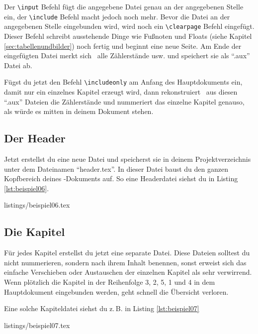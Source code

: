 Der \texttt{\textbackslash input} Befehl fügt die angegebene Datei genau an der angegebenen Stelle ein, der \texttt{\textbackslash include} Befehl macht jedoch noch mehr. Bevor die Datei an der angegebenen Stelle eingebunden wird, wird noch ein \texttt{\textbackslash clearpage} Befehl eingefügt. Dieser Befehl schreibt ausstehende Dinge wie Fußnoten und Floats (siehe Kapitel \ref{sec:tabellenundbilder}) noch fertig und beginnt eine neue Seite. Am Ende der eingefügten Datei merkt sich \DMLLaTeX \ alle Zählerstände usw. und speichert sie als \enquote{.aux} Datei ab.

Fügst du jetzt den Befehl \texttt{\textbackslash includeonly} am Anfang des Hauptdokuments ein, damit nur ein einzelnes Kapitel erzeugt wird, dann rekonstruiert \DMLLaTeX \ aus diesen \enquote{.aux} Dateien die Zählerstände und nummeriert das einzelne Kapitel genauso, als würde es mitten in deinem Dokument stehen.

\subsection{Der Header}

Jetzt erstellst du eine neue Datei und speicherst sie in deinem Projektverzeichnis unter dem Dateinamen \enquote{header.tex}. In dieser Datei baust du den ganzen Kopfbereich deines \DMLLaTeX-Dokuments auf. So eine Headerdatei siehst du in Listing \ref{lst:beispiel06}.

%
	{listings/beispiel06.tex}

\subsection{Die Kapitel}

Für jedes Kapitel erstellst du jetzt eine separate Datei. Diese Dateien solltest du nicht nummerieren, sondern nach ihrem Inhalt benennen, sonst erweist sich das einfache Verschieben oder Austauschen der einzelnen Kapitel als sehr verwirrend. Wenn plötzlich die Kapitel in der Reihenfolge 3, 2, 5, 1 und 4 in dem Hauptdokument eingebunden werden, geht schnell die Übersicht verloren.

Eine solche Kapiteldatei siehst du z.\,B. in Listing \ref{lst:beispiel07}

%
	{listings/beispiel07.tex}

